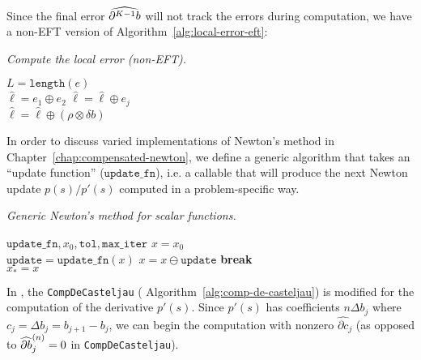 \noindent Since the final error \(\cdb{K - 1}\) will not track the errors
during computation, we have a non-EFT version of
Algorithm~\ref{alg:local-error-eft}:

\begin{breakablealgorithm}
  \caption{\textit{Compute the local error (non-EFT).}}
  \label{alg:local-error}

  \begin{algorithmic}
      \State \(L = \texttt{length}(e)\)
      \\
      \State \(\widehat{\ell} = e_1 \oplus e_2\)
        \State \(\widehat{\ell} = \widehat{\ell} \oplus e_j\)
      \EndFor
      \\
      \State \(\widehat{\ell} = \widehat{\ell} \oplus \left(
          \rho \otimes \delta b\right)\)
    \EndFunction
  \end{algorithmic}
\end{breakablealgorithm}

In order to discuss varied implementations of Newton's method in
Chapter~\ref{chap:compensated-newton}, we define a generic algorithm
that takes an ``update function'' (\(\mathtt{update\_fn}\)), i.e.
a callable that will produce the next Newton update \(p(s) / p'(s)\)
computed in a problem-specific way.

\begin{breakablealgorithm}
  \caption{\textit{Generic Newton's method for scalar functions.}}
  \label{alg:generic-newton}

  \begin{algorithmic}
             {$\mathtt{update\_fn}, x_0, \mathtt{tol}, \mathtt{max\_iter}$}
      \State \(x = x_0\)
      \\
        \State \(\mathtt{update} = \mathtt{update\_fn}(x)\)
        \State \(x = x \ominus \mathtt{update}\)
          \State \textbf{break}
        \EndIf
      \EndFor
      \\
      \State \(x_{\ast} = x\)
    \EndFunction
  \end{algorithmic}
\end{breakablealgorithm}

In \cite[Algorithm~3]{Jiang2010}, the \texttt{CompDeCasteljau} (
Algorithm~\ref{alg:comp-de-casteljau}) is modified for the computation
of the derivative \(p'(s)\). Since \(p'(s)\) has coefficients
\(n \Delta b_j\) where \(c_j = \Delta b_j = b_{j + 1} - b_j\),
we can begin the computation with nonzero
\(\widehat{\partial c}_j\) (as opposed to
\(\cdb{1}_j^{(n)} = 0\) in \texttt{CompDeCasteljau}).

